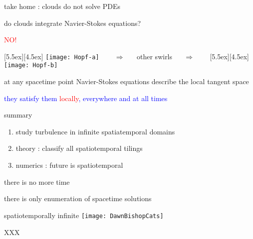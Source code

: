 \begin{frame}{take home : clouds do not solve PDEs}

do clouds integrate Navier-Stokes equations?

\begin{center}
\centerline{\textcolor{red}{\Huge NO!}}

\begin{minipage}[t]{\textwidth}
	\begin{center}
\centerline{
\raisebox{-4.0ex}[5.5ex][4.5ex]
		 {\texttt{[image: Hopf-a]}}
~~~ $\Longrightarrow$ ~~ {other swirls} ~~ $\Longrightarrow$ ~~~
	\raisebox{-4.0ex}[5.5ex][4.5ex]
		 {\texttt{[image: Hopf-b]}}
          }
	\end{center}
\end{minipage}
\end{center}

at any spacetime point Navier-Stokes equations describe the local tangent space

\bigskip

\centerline{
\textcolor{blue}{they satisfy them \textcolor{red}{\large locally}, everywhere and at all times}
}
\end{frame}


\begin{frame}{summary}
\begin{enumerate}
              \item
study turbulence in infinite spatiatemporal domains
              \item
theory : classify all spatiotemporal tilings
              \item
numerics : future is spatiotemporal
\end{enumerate}

\vfill

there is no more time

\medskip

there is only enumeration of spacetime solutions
\end{frame}

\begin{frame}{spatiotemporally infinite \catlatt}
\hfill\texttt{[image: DawnBishopCats]}
\end{frame}

\begin{frame}{XXX}
\end{frame}




